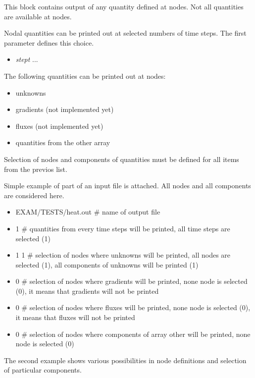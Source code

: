This block contains output of any quantity defined at nodes. Not all quantities are available
at nodes.

Nodal quantities can be printed out at selected numbers of time steps. The first parameter defines this choice.
\begin{itemize}
\item[] {\it stept} ... 
\end{itemize}

The following quantities can be printed out at nodes:
\begin{itemize}
\item unknowns
\item gradients (not implemented yet)
\item fluxes (not implemented yet)
\item quantities from the other array
\end{itemize}

Selection of nodes and components of quantities must be defined for
all items from the previos list.

Simple example of part of an input file is attached. All nodes and all components
are considered here. 

\begin{itemize}
\item[]
EXAM/TESTS/heat.out \# name of output file
\item[]
1 \# quantities from every time steps will be printed, all time steps are selected (1)
\item[]
1 1 \# selection of nodes where unknowns will be printed, all nodes
are selected (1), all components of unknowns will be printed (1)
\item[]
0 \# selection of nodes where gradients will be printed, none node is selected (0), it means that gradients
will not be printed
\item[]
0 \# selection of nodes where fluxes will be printed, none node is selected (0), it means that fluxes
will not be printed
\item[]
0 \# selection of nodes where components of array other will be printed, none node is selected (0)
\end{itemize}

The second example shows various possibilities in node definitions and selection of particular components.

